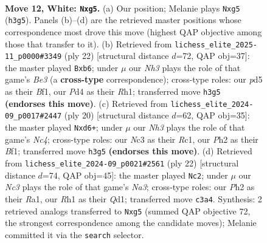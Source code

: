 \documentclass[11pt]{article}
\begin{document}
\clearpage

\begin{figure}[p]\centering
\begin{subfigure}{0.46\textwidth}\centering
\resizebox{\linewidth}{!}{%
\newchessgame
\chessboard[
  setfen={1rbqk2r/pp1n2pp/2p2p2/3p2b1/3P4/2N1P2N/PP2BPPP/R2QK2R w KQk - 2 12},
  showmover=false,
  pgfstyle=straightmove, color=movearrow, markmove={h3-g5}
]}
\caption{}
\end{subfigure}\hfill
\begin{subfigure}{0.46\textwidth}\centering
\resizebox{\linewidth}{!}{%
\newchessgame
\chessboard[
  setfen={r2qkb1r/5ppp/pn1p1n2/1p1Pp3/8/1N2BP2/PPPQ2PP/R3KB1R w KQkq - 1 12},
  showmover=false,
  pgfstyle=straightmove, color=movearrow, markmove={e3-b6}
]}
\caption{}
\end{subfigure}
\\[4pt]
\begin{subfigure}{0.46\textwidth}\centering
\resizebox{\linewidth}{!}{%
\newchessgame
\chessboard[
  setfen={r1b1k2r/ppq2ppp/2pbpn2/8/2NP4/2N1P3/PP3PPP/2RQKB1R w Kkq - 3 11},
  showmover=false,
  pgfstyle=straightmove, color=movearrow, markmove={c4-d6}
]}
\caption{}
\end{subfigure}\hfill
\begin{subfigure}{0.46\textwidth}\centering
\resizebox{\linewidth}{!}{%
\newchessgame
\chessboard[
  setfen={r1bqk2r/4nppp/p2p1b2/1p1Np3/4P3/N1P5/PP3PPP/R2QKB1R w KQkq - 1 12},
  showmover=false,
  pgfstyle=straightmove, color=movearrow, markmove={a3-c2}
]}
\caption{}
\end{subfigure}
\caption{\textbf{Move 12, White: \texttt{Nxg5}.} (a) Our position; Melanie plays \texttt{Nxg5} (\texttt{h3g5}). Panels (b)--(d) are the retrieved master positions whose correspondence most drove this move (highest QAP objective among those that transfer to it). (b) Retrieved from \texttt{lichess\_elite\_2025-11\_p0000\#3349} (ply 22) [structural distance $d$=72, QAP obj=37]: the master played \texttt{Bxb6}; under $\mu$ our \emph{Nh3} plays the role of that game's \emph{Be3} (a \textbf{cross-type} correspondence); cross-type roles: our \emph{p}d5 as their \emph{B}f1, our \emph{P}d4 as their \emph{R}h1; transferred move \texttt{h3g5} \textbf{(endorses this move)}. (c) Retrieved from \texttt{lichess\_elite\_2024-09\_p0017\#2447} (ply 20) [structural distance $d$=62, QAP obj=35]: the master played \texttt{Nxd6+}; under $\mu$ our \emph{Nh3} plays the role of that game's \emph{Nc4}; cross-type roles: our \emph{N}c3 as their \emph{R}c1, our \emph{P}h2 as their \emph{B}f1; transferred move \texttt{h3g5} \textbf{(endorses this move)}. (d) Retrieved from \texttt{lichess\_elite\_2024-09\_p0021\#2561} (ply 22) [structural distance $d$=74, QAP obj=45]: the master played \texttt{Nc2}; under $\mu$ our \emph{Nc3} plays the role of that game's \emph{Na3}; cross-type roles: our \emph{P}h2 as their \emph{R}a1, our \emph{R}h1 as their \emph{Q}d1; transferred move \texttt{c3a4}. Synthesis: 2 retrieved analogs transferred to \texttt{Nxg5} (summed QAP objective 72, the strongest correspondence among the candidate moves); Melanie committed it via the \texttt{search} selector.}
\label{fig:thought-m22}
\end{figure}
\end{document}

